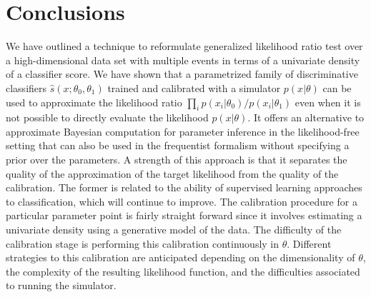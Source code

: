 \documentclass[12pt]{article}
\numberwithin{equation}{section}
\theoremstyle{plain}
\begin{document}
\section{Conclusions}
\label{sec:conclusions}

We have outlined a technique to reformulate generalized likelihood ratio test
over a high-dimensional data set with multiple events in terms of a univariate
density of a classifier score. We have shown that a parametrized family of
discriminative classifiers $\hat s(x; \theta_0, \theta_1)$ trained and
calibrated with a simulator  $p(x|\theta)$ can be used to approximate the
likelihood ratio  $\prod_i p(x_i|\theta_0)/p(x_i|\theta_1)$ even when it is not
possible to directly evaluate the likelihood $p(x|\theta)$.
It offers an alternative to approximate Bayesian computation for parameter
inference in the likelihood-free setting that can also be used in the
frequentist formalism without specifying a prior over the parameters. A strength
of this approach is that it separates the quality of the approximation of the
target likelihood from the quality of the calibration. The former is related to
the ability of supervised learning approaches to  classification, which will
continue to improve. The calibration procedure for a particular parameter point
is fairly straight forward since it involves estimating a univariate density
using a generative model of the data. The difficulty of the calibration stage is
performing this calibration continuously in $\theta$. Different strategies to
this calibration are anticipated depending on the dimensionality of $\theta$,
the complexity of the resulting likelihood function, and the difficulties
associated to running the simulator.



\end{document}
